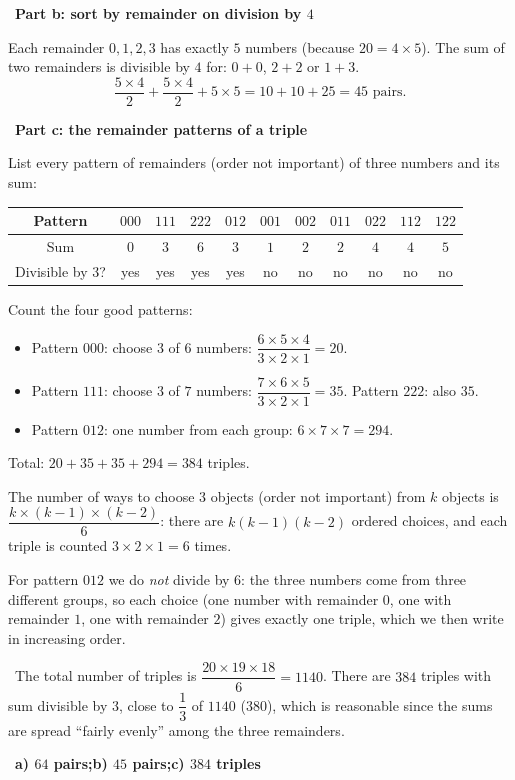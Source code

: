 \documentclass[11pt]{article}
\providecommand{\AnsWord}{Đáp số}
\newcommand{\ans}[1]{\par\smallskip{\bfseries\color{tmGreen!88!black}\AnsWord:}\ {\bfseries\color{AnsRed}#1}\par}
\newcommand{\step}[2]{\par\smallskip\noindent{\bfseries\color{tmBlue!85!black}\StepWord~#1.}\ {\bfseries #2}\par\nopagebreak}
\newcommand{\verify}[1]{\par\smallskip\noindent{\bfseries\color{tmGreen!80!black}\faCheckCircle\ \CheckWord}\ #1\par}
\def\AnsWord{Answer}
\def\StepWord{Step}
\def\CheckWord{Check:}
\begin{document}
{\step{3}{Part b: sort by remainder on division by $4$}
Each remainder $0,1,2,3$ has exactly $5$ numbers (because $20=4\times5$). The sum of two remainders is divisible by $4$ for: $0+0$, $2+2$
or $1+3$.
\[\frac{5\times4}{2}+\frac{5\times4}{2}+5\times5=10+10+25=45 \text{ pairs.}\]

\step{4}{Part c: the remainder patterns of a triple}
List every pattern of remainders (order not important) of three numbers and its sum:
\begin{center}\begin{tabular}{|c|c|c|c|c|c|c|c|c|c|c|}\hline
Pattern & $000$ & $111$ & $222$ & $012$ & $001$ & $002$ & $011$ & $022$ & $112$ & $122$\\\hline
Sum & $0$ & $3$ & $6$ & $3$ & $1$ & $2$ & $2$ & $4$ & $4$ & $5$\\\hline
Divisible by $3$? & yes & yes & yes & yes & no & no & no & no & no & no\\\hline
\end{tabular}\end{center}
Count the four good patterns:
\begin{itemize}[leftmargin=1.2em,itemsep=1pt,topsep=2pt]
\item Pattern $000$: choose $3$ of $6$ numbers: $\dfrac{6\times5\times4}{3\times2\times1}=20$.
\item Pattern $111$: choose $3$ of $7$ numbers: $\dfrac{7\times6\times5}{3\times2\times1}=35$. Pattern $222$: also $35$.
\item Pattern $012$: one number from each group: $6\times7\times7=294$.
\end{itemize}
Total: $20+35+35+294=384$ triples.
\begin{recallbox}The number of ways to choose $3$ objects (order not important) from $k$ objects is $\dfrac{k\times(k-1)\times(k-2)}{6}$:
there are $k(k-1)(k-2)$ ordered choices, and each triple is counted $3\times2\times1=6$ times.\end{recallbox}
\begin{warnbox}For pattern $012$ we do \emph{not} divide by $6$: the three numbers come from three different groups, so each choice (one number
with remainder $0$, one with remainder $1$, one with remainder $2$) gives exactly one triple, which we then write in increasing order.\end{warnbox}
\verify{The total number of triples is $\dfrac{20\times19\times18}{6}=1140$. There are $384$ triples with sum divisible by $3$, close to
$\dfrac13$ of $1140$ ($380$), which is reasonable since the sums are spread ``fairly evenly'' among the three remainders.}
\ans{a) $64$ pairs;\quad b) $45$ pairs;\quad c) $384$ triples}
}
\end{document}
